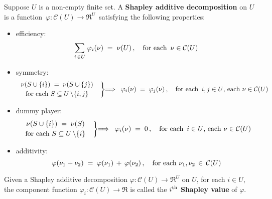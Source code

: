 \begin{definition}
\label{definition:ShapleyDecomposition}
\mbox{}
\vskip 0.1cm
\noindent
Suppose $U$ is a non-empty finite set.
A \textbf{Shapley additive decomposition} on $U$ is a function
\,$\varphi : \mathcal{C}(U) \longrightarrow \Re^{U}$\,
satisfying the following properties:
\begin{itemize}
\item
	efficiency:
	\begin{equation*}
	\underset{i \,\in U}{\sum}\; \varphi_{i}(\nu) \; = \; \nu(U)\,,
	\quad
	\textnormal{for each \,$\nu \in \mathcal{C}(U)$}
	\end{equation*}
\item
	symmetry:\;\;
	\begin{equation*}
		\left.\begin{array}{c}
			\nu\!\left(S\cup\{i\}\right) \; = \; \nu\!\left(S\cup\{j\}\right)
			\\
			\textnormal{for each $\overset{{\color{white}.}}{S} \subseteq U\,\backslash \{i,j\}$}
		\end{array}
		\;\;\right\}\!\!\Longrightarrow\;\;
		\varphi_{i}(\nu) \; = \; \varphi_{j}(\nu)\,,
	\quad
		\textnormal{for each \,$i,j \in U$, each $\nu \in \mathcal{C}(U)$}
	\end{equation*}
\item
	dummy player:\;\;
	\begin{equation*}
		\left.\begin{array}{c}
			\nu\!\left(S\cup\{i\}\right) \; = \; \nu\!\left(S\right)
			\\
			\textnormal{for each $\overset{{\color{white}.}}{S} \subseteq U\,\backslash \{i\}$}
		\end{array}
		\;\;\right\}\!\!\Longrightarrow\;\;
		\varphi_{i}(\nu) \; = \; 0\,,
	\quad
		\textnormal{for each \,$i \in U$, each $\nu \in \mathcal{C}(U)$}
	\end{equation*}
\item
	additivity:\;\;
	\begin{equation*}
		\varphi(\nu_{1}+\nu_{2}) \; = \; \varphi(\nu_{1}) \, + \, \varphi(\nu_{2})\,,
	\quad
		\textnormal{for each $\nu_{1}, \nu_{2} \,\in\, \mathcal{C}(U)$}
	\end{equation*}
\end{itemize}
Given a Shapley additive decomposition
$\varphi : \mathcal{C}(U) \longrightarrow \Re^{U}$ on $U$,
for each $i \in U$, the component function
$\varphi_{i} : \mathcal{C}(U) \longrightarrow \Re$
is called the \textbf{$i^{\textnormal{th}}$ Shapley value} of $\varphi$.
\end{definition}

